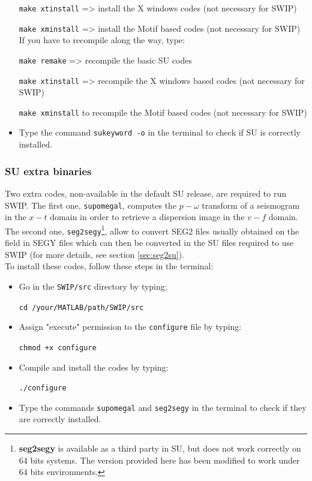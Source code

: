 \documentclass[twoside,a4paper]{article}
\begin{document}
\begin{itemize}
\verb|make xtinstall| => install the X windows codes (not necessary for SWIP)

\verb|make xminstall| => install the Motif based codes (not necessary for SWIP)\\[1ex]
If you have to recompile along the way, type:

\verb|make remake| => recompile the basic SU codes

\verb|make xtinstall| => recompile the X windows based codes (not necessary for SWIP)

\verb|make xminstall| to recompile the Motif based codes (not necessary for SWIP)

\item Type the command \verb|sukeyword -o| in the terminal to check if SU is correctly installed.
\end{itemize}

\subsubsection{SU extra binaries}
Two extra codes, non-available in the default SU release, are required to run SWIP. The first one, \verb|supomegal|, computes the $p-\omega$ transform of a seismogram in the $x-t$ domain in order to retrieve a dispersion image in the $v-f$ domain. The second one, \verb|seg2segy|\footnote{\textbf{seg2segy} is available as a third party in SU, but does not work correctly on 64 bits systems. The version provided here has been modified to work under 64 bits environments.}, allow to convert SEG2 files usually obtained on the field in SEGY files which can then be converted in the SU files required to use SWIP (for more details, see section \ref{sec:seg2su}).\\[1ex]
To install these codes, follow these steps in the terminal:
\begin{itemize}
\setlength\itemsep{2ex}
\setlength{\parindent}{5ex}
\item Go in the \verb|SWIP/src| directory by typing:

\verb|cd /your/MATLAB/path/SWIP/src|

\item Assign "execute" permission to the \verb|configure| file by typing:

\verb|chmod +x configure|

\item Compile and install the codes by typing:

\verb|./configure|

\item Type the commands \verb|supomegal| and \verb|seg2segy| in the terminal to check if they are correctly installed.

\end{itemize}
\end{document}
